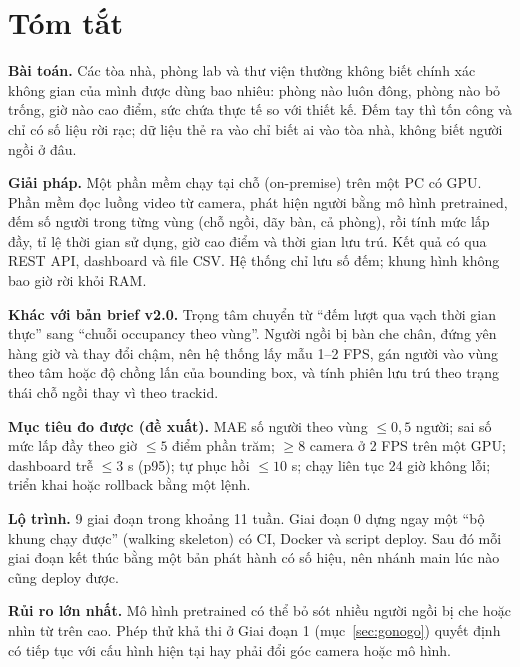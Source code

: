 \documentclass[10pt,a4paper,oneside,openany]{report}
\newcommand{\breakus}{\textunderscore\allowbreak}
\newcommand{\code}[1]{{\ttfamily\let\_\breakus #1}}
\begin{document}
\chapter*{Tóm tắt}

\begin{tomtat}
\textbf{Bài toán.} Các tòa nhà, phòng lab và thư viện thường không biết chính xác không gian của mình được dùng bao nhiêu:
phòng nào luôn đông, phòng nào bỏ trống, giờ nào cao điểm, sức chứa thực tế so với thiết kế. Đếm tay thì tốn công và
chỉ có số liệu rời rạc; dữ liệu thẻ ra vào chỉ biết ai vào tòa nhà, không biết người ngồi ở đâu.

\textbf{Giải pháp.} Một phần mềm chạy tại chỗ (on-premise) trên một PC có GPU. Phần mềm đọc luồng video từ camera,
phát hiện người bằng mô hình pretrained, đếm số người trong từng vùng (chỗ ngồi, dãy bàn, cả phòng), rồi tính
mức lấp đầy, tỉ lệ thời gian sử dụng, giờ cao điểm và thời gian lưu trú. Kết quả có qua REST API, dashboard và file CSV.
Hệ thống chỉ lưu số đếm; khung hình không bao giờ rời khỏi RAM.

\textbf{Khác với bản brief v2.0.} Trọng tâm chuyển từ \enquote{đếm lượt qua vạch thời gian thực} sang
\enquote{chuỗi occupancy theo vùng}. Người ngồi bị bàn che chân, đứng yên hàng giờ và thay đổi chậm, nên hệ thống
lấy mẫu 1--2 FPS, gán người vào vùng theo tâm hoặc độ chồng lấn của bounding box, và tính phiên lưu trú theo trạng thái
chỗ ngồi thay vì theo \code{track\_id}.

\textbf{Mục tiêu đo được (đề xuất).} MAE số người theo vùng $\le 0{,}5$ người; sai số mức lấp đầy theo giờ
$\le 5$ điểm phần trăm; $\ge 8$ camera ở 2 FPS trên một GPU; dashboard trễ $\le 3$ s (p95); tự phục hồi
$\le 10$ s; chạy liên tục 24 giờ không lỗi; triển khai hoặc rollback bằng một lệnh.

\textbf{Lộ trình.} 9 giai đoạn trong khoảng 11 tuần. Giai đoạn 0 dựng ngay một \enquote{bộ khung chạy được}
(walking skeleton) có CI, Docker và script deploy. Sau đó mỗi giai đoạn kết thúc bằng một bản phát hành có số hiệu,
nên nhánh \code{main} lúc nào cũng deploy được.

\textbf{Rủi ro lớn nhất.} Mô hình pretrained có thể bỏ sót nhiều người ngồi bị che hoặc nhìn từ trên cao.
Phép thử khả thi ở Giai đoạn 1 (mục~\ref{sec:gonogo}) quyết định có tiếp tục với cấu hình hiện tại hay phải đổi
góc camera hoặc mô hình.
\end{tomtat}
\end{document}
